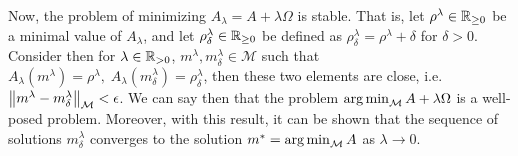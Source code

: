 Now, the problem of minimizing $A_\lambda = A + \lambda \Omega$ is stable. That is, let $\rho^\lambda \in \mathbb{R}_{\geq 0}$ be a minimal value of $A_\lambda$, and let $\rho^\lambda_\delta \in \mathbb{R}_{\geq 0}$ be defined as $\rho^\lambda_\delta = \rho^\lambda + \delta$ for $\delta > 0$. Consider then for $\lambda \in \mathbb{R}_{> 0}$, $m^\lambda, m^\lambda_\delta \in \mathcal{M}$ such that $A_\lambda(m^\lambda) = \rho^\lambda, \; A_\lambda(m^\lambda_\delta) = \rho^\lambda_\delta$, then these two elements are close, i.e. $\left\lVert m^\lambda - m^\lambda_\delta\right\rVert_{\mathcal{M}} < \epsilon$.
%
We can say then that the problem $\operatorname*{arg\min}_{\mathcal{M}} A + \lambda \Omega$ is a well-posed problem. 
%
Moreover, with this result, it can be shown that the sequence of solutions $m^\lambda_\delta$ converges to the solution $m^* = \operatorname*{arg\min}_{\mathcal{M}} A$ as $\lambda \to 0$.






